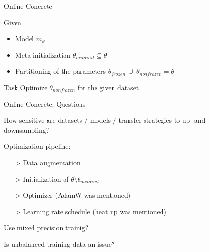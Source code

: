 \documentclass[aspectratio=169,12pt,handout]{beamer}
\begin{document}
\begin{frame}{Online Concrete}



\begin{block}{Given}
    \begin{itemize}
        \item Model $m_\theta$
        \item Meta initialization $\theta_{metainit} \subseteq  \theta$
        \item Partitioning of the parameters $\theta_{frozen} \ \dot{\cup} \ \theta_{nonfrozen} = \theta$
    \end{itemize}
\end{block}

\begin{block}{Task}
Optimize $\theta_{nonfrozen}$ for the given dataset
\end{block}



\end{frame}



\begin{frame}{Online Concrete: Questions}

\begin{itemizebig}
    \item<1->
    How sensitive are datasets / models / transfer-strategies to up- and downsampling?

    \item<2->
    Optimization pipeline:
    \begin{itemize}
        \item[>] Data augmentation
        \item[>] Initialization of $\theta \setminus \theta_{metainit}$
        \item[>] Optimizer (AdamW was mentioned)
        \item[>] Learning rate schedule (heat up was mentioned)
    \end{itemize}

    \item<3->
    Use mixed precision trainig?

    \item<4>
    Is unbalanced training data an issue?

\end{itemizebig}

\end{frame}
\end{document}
